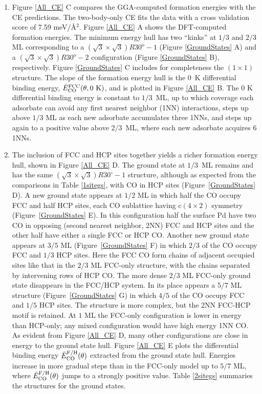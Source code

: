 \documentclass[11pt]{article}
\begin{document}
\begin{enumerate}
\item Figure \ref{All_CE} C compares the GGA-computed formation energies with the CE predictions.  The two-body-only CE fits the data with a cross validation score of 7.59 meV/\AA$^2$. Figure \ref{All_CE} A shows the DFT-computed formation energies.  The minimum energy hull has two ``kinks''  at $1/3$ and $2/3$ ML corresponding to a $(\sqrt{3} \times \sqrt{3})R30^\mathrm{o}-1$   (Figure \ref{GroundStates} A) and a $(\sqrt{3} \times \sqrt{3})R30^\mathrm{o}-2$  configuration (Figure \ref{GroundStates} B), respectively.  Figure \ref{GroundStates} C includes for completeness the  $(1 \times 1)$ structure.  The slope of the formation energy hull is the 0~K  differential binding energy, $\bar{E}_{\ce{CO}}^{\text{FCC}}(\theta,0~\text{K})$, and is plotted in  Figure \ref{All_CE}  B.  The 0 K differential binding energy is constant to $1/3$~ML, up to which coverage each adsorbate can avoid any first nearest neighbor (1NN) interactions, steps up above $1/3$ ML as each new adsorbate accumulates three 1NNs, and steps up again to a positive value above $2/3$~ML, where each new adsorbate acquires 6 1NNs.

\item The inclusion of FCC and HCP sites together yields a richer formation energy hull, shown in Figure \ref{All_CE} D. The ground state at $1/3$~ML remains and has the same $(\sqrt{3} \times \sqrt{3})R30^\circ-1$  structure, although as expected from the comparisons in Table \ref{1sitegs}, with CO in HCP sites (Figure~\ref{GroundStates} D).  A new ground state appears at $1/2$ ML in which half the CO occupy FCC and half HCP sites, each CO sublattice having c$(4\times2)$ symmetry (Figure~\ref{GroundStates} E).  In this configuration half the surface Pd have two CO in opposing (second nearest neighbor, 2NN) FCC and HCP sites and the other half have either a single FCC or HCP CO.  Another new ground state appears at $3/5$ ML (Figure~\ref{GroundStates} F) in which $2/3$ of the CO occupy FCC and $1/3$ HCP sites.  Here the FCC CO form chains of adjacent occupied sites like that in the $2/3$ ML FCC-only structure, with the chains separated by intervening rows of HCP CO.  The more dense $2/3$ ML FCC-only ground state disappears in the FCC/HCP system.  In its place appears a $5/7$ ML structure (Figure~\ref{GroundStates} G) in which $4/5$ of the CO occupy FCC and $1/5$ HCP sites.  The structure is more complex, but the 2NN FCC-HCP motif is retained.  At $1$ ML the FCC-only configuration is lower in energy than HCP-only; any mixed configuration would have high energy 1NN CO. As evident from Figure \ref{All_CE} D, many other configurations are close in energy to the ground state hull.  Figure \ref{All_CE} E plots the differential binding energy $\bar{E}_{\ce{CO}}^{\mathrm{F/H}}(\theta)$ extracted from the ground state hull.  Energies increase in more gradual steps than in the FCC-only model up to $5/7$ ML, where $\bar{E}_{\ce{CO}}^{\text{F/H}}(\theta)$ jumps to a strongly positive value.  Table \ref{2sitegs} summaries the structures for the ground states.


\end{enumerate}
\end{document}
